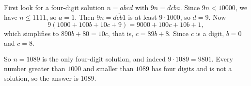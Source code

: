First look for a four-digit solution $n=\overline{abcd}$ with $9n=\overline{dcba}$. Since $9n<10000$, we have $n\le1111$, so $a=1$. Then $9n=\overline{dcb1}$ is at least $9\cdot1000$, so $d=9$. Now
\[9\left(1000+100b+10c+9\right)=9000+100c+10b+1,\]
which simplifies to $890b+80=10c$, that is, $c=89b+8$. Since $c$ is a digit, $b=0$ and $c=8$.

So $n=1089$ is the only four-digit solution, and indeed $9\cdot1089=9801$. Every number greater than $1000$ and smaller than $1089$ has four digits and is not a solution, so the answer is $\boxed{1089}$.
